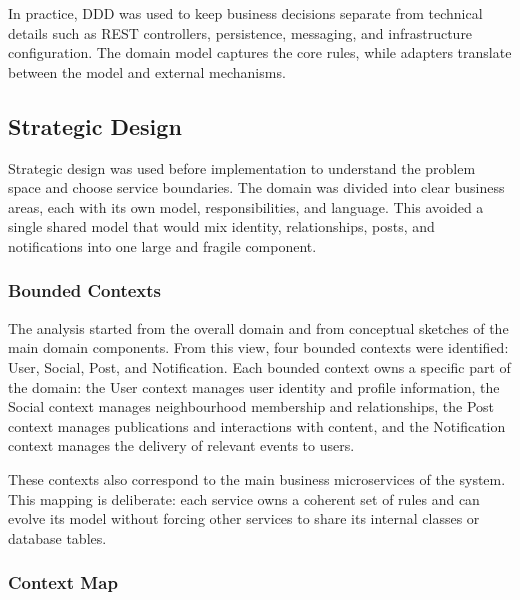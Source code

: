\documentclass[12pt,a4paper]{article}
\begin{document}
In practice, DDD was used to keep business decisions separate from technical details such as REST controllers, persistence, messaging, and infrastructure configuration. The domain model captures the core rules, while adapters translate between the model and external mechanisms.

\subsection{Strategic Design}

Strategic design was used before implementation to understand the problem space and choose service boundaries. The domain was divided into clear business areas, each with its own model, responsibilities, and language. This avoided a single shared model that would mix identity, relationships, posts, and notifications into one large and fragile component.

\subsubsection{Bounded Contexts}

The analysis started from the overall domain and from conceptual sketches of the main domain components. From this view, four bounded contexts were identified: User, Social, Post, and Notification. Each bounded context owns a specific part of the domain: the User context manages user identity and profile information, the Social context manages neighbourhood membership and relationships, the Post context manages publications and interactions with content, and the Notification context manages the delivery of relevant events to users.

These contexts also correspond to the main business microservices of the system. This mapping is deliberate: each service owns a coherent set of rules and can evolve its model without forcing other services to share its internal classes or database tables.

\subsubsection{Context Map}
\end{document}
